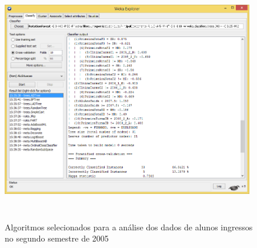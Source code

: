 \begin{figure}[!h]
	\centering
	{\includegraphics[width=11cm, height=10cm]{images/weka_mineracao}}
	\caption {Algoritmos selecionados para a análise dos dados de alunos ingressos no segundo semestre de 2005}
	\label{weka5_mineracao}
\end{figure}




